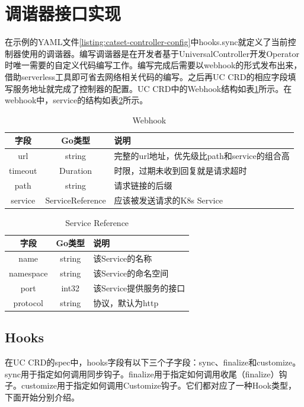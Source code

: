 \documentclass[macfonts,master]{njuthesis}
\begin{document}
\section{调谐器接口实现}
在示例的YAML文件\ref{listing:catset-controller-config}中hooks.sync就定义了当前控制器使用的调谐器。编写调谐器是在开发者基于UniversalController开发Operator时唯一需要的自定义代码编写工作。编写完成后需要以webhook的形式发布出来，借助serverless工具即可省去网络相关代码的编写。之后再UC CRD的相应字段填写服务地址就完成了控制器的配置。UC CRD中的Webhook结构如表\ref{table:webhook}所示。在webhook中，service的结构如表\ref{table:service-reference}所示。

\begin{table}
  \centering
  \begin{tabular}{ccp{50mm}}
    \toprule
    \textbf{字段} & \textbf{Go类型} & \textbf{说明} \\
    \midrule
    url  & string  & 完整的url地址，优先级比path和service的组合高\\
    timeout  & Duration   &  时限，过期未收到回复就是请求超时 \\
    path     & string  &  请求链接的后缀 \\
    service    & ServiceReference   &  应该被发送请求的K8s Service \\
    \bottomrule
  \end{tabular}
  \caption{Webhook}\label{table:webhook}
\end{table}

\begin{table}
  \centering
  \begin{tabular}{ccp{50mm}}
    \toprule
    \textbf{字段} & \textbf{Go类型} & \textbf{说明} \\
    \midrule
    name  & string  & 该Service的名称\\
    namespace  & string   &  该Service的命名空间 \\
    port     & int32  & 该Service提供服务的接口 \\
    protocol    & string   &  协议，默认为http \\
    \bottomrule
  \end{tabular}
  \caption{Service Reference}\label{table:service-reference}
\end{table}

\subsection{Hooks}
在UC CRD的spec中，hooks字段有以下三个子字段：sync、finalize和customize。sync用于指定如何调用同步钩子。finalize用于指定如何调用收尾（finalize）钩子。customize用于指定如何调用Customize钩子。它们都对应了一种Hook类型，下面开始分别介绍。
\end{document}
